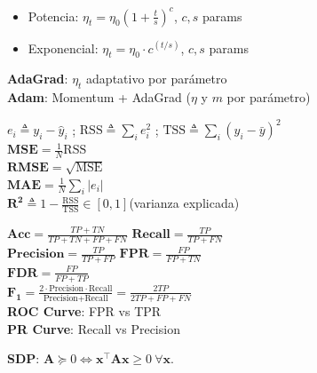 \documentclass[11pt, a4paper]{article}
\newcommand{\x}{\mathbf{x}}
\begin{document}
\begin{minipage}[t]{0.325\textwidth}
\begin{tcolorbox}[formulabox=Optimization, colframe=softBrown]
\begin{itemize}
            \item Potencia: $\eta_t = \eta_0 (1+\frac{t}{s})^c$, \quad $c,s$ params
            \item Exponencial: $\eta_t = \eta_0 \cdot c^{(t/s)}$, \quad $c,s$ params
        \end{itemize}
        \textbf{AdaGrad}: $\eta_t$ adaptativo por parámetro\\
        \textbf{Adam}: Momentum + AdaGrad ($\eta$ y $m$ por parámetro)\\
    \end{tcolorbox}
    \begin{tcolorbox}[formulabox=Regression Metrics, colframe=softGreen]
        $e_i \triangleq y_i - \hat{y}_i$ ;
        $\text{RSS} \triangleq \sum_i e_i^2$ ;
        $\text{TSS} \triangleq \sum_i (y_i-\bar{y})^2$\\
        \vspace{-2mm}
        \tcbline
        \vspace{-2mm}
        $\textbf{MSE} = \frac{1}{N}\text{RSS}$ \\
        $\textbf{RMSE} = \sqrt{\text{MSE}}$\\
        $\textbf{MAE} = \frac{1}{N}\sum_i |e_i|$\\
        $\boldsymbol{R^2} \triangleq 1 - \frac{\text{RSS}}{\text{TSS}} \in [0,1]$\quad (varianza explicada)
    \end{tcolorbox}
    \begin{tcolorbox}[formulabox=Classification Metrics, colframe=softGreen]
        $\textbf{Acc} = \frac{TP+TN}{TP+TN+FP+FN}$\quad
        $\textbf{Recall} = \frac{TP}{TP+FN}$\\
        $\textbf{Precision} = \frac{TP}{TP+FP}$\quad
        $\textbf{FPR} = \frac{FP}{FP+TN}$\\
        $\textbf{FDR} = \frac{FP}{FP+TP}$\\
        $\boldsymbol{F_1} = \frac{2 \cdot \text{Precision} \cdot \text{Recall}}{\text{Precision}+\text{Recall}} = \frac{2TP}{2TP+FP+FN}$\\[2pt]
        \textbf{ROC Curve}: FPR vs TPR \\
        \textbf{PR Curve}: Recall vs Precision \\
    \end{tcolorbox}
    \begin{tcolorbox}[formulabox=Linear Algebra, colframe=softOrange]
        \textbf{SDP}: $\mathbf{A}\succeq 0 \Leftrightarrow \x^\top\mathbf{A}\x \geq 0\ \forall\x$.\quad

\end{tcolorbox}
\end{minipage}
\end{document}
